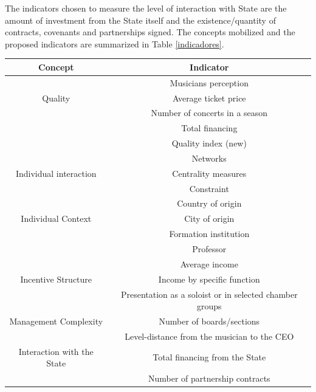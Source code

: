 \documentclass[a4paper, 12pt, openright, oneside, german, french, brazil, english, article]{abntex2}
\begin{document}
	
	The indicators chosen to measure the level of interaction with State are the amount of investment from the State itself and the existence/quantity of contracts, covenants and partnerships signed. The concepts mobilized and the proposed indicators are summarized in Table \ref{indicadores}.
	
	
	
	\begin{table}[ht]
		{\begin{tabular}{|c|c|}
				
				\hline
				\textbf{Concept} & \textbf{Indicator} \\
				\hline
				&  Musicians perception \\
				Quality  &  Average ticket price \\
				&  Number of concerts in a season \\
				&  Total financing \\
				&  Quality index (new) \\
				\hline
				
				& Networks \\
				Individual interaction & Centrality measures  \\
				& Constraint      \\
				\hline
				& Country of origin  \\
				Individual Context & City of origin  \\
				& Formation institution \\
				& Professor    \\
				\hline
				& Average income  \\
				Incentive Structure & Income by specific function \\
				& Presentation as a soloist or in selected chamber groups \\
				\hline
				Management Complexity  & Number of boards/sections  \\
				& Level-distance from the musician to the CEO \\
				\hline
				Interaction with the State  & Total financing from the State  \\
				& Number of partnership contracts \\
				\hline
				
				
			\end{tabular}
		}
		{}
		
	\end{table}
	
\end{document}
